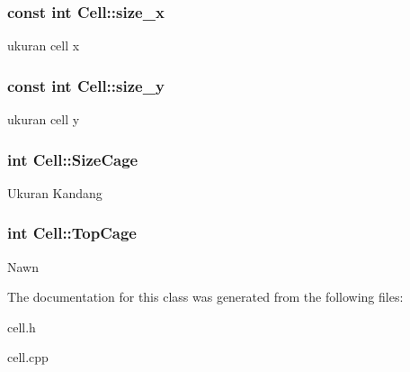 \subsubsection[{\texorpdfstring{size\+\_\+x}{size_x}}]{\setlength{\rightskip}{0pt plus 5cm}const int Cell\+::size\+\_\+x\hspace{0.3cm}{\ttfamily [protected]}}\hypertarget{class_cell_af80d7dad162978ba5aa1ff3fca5f632e}{}\label{class_cell_af80d7dad162978ba5aa1ff3fca5f632e}
ukuran cell x 
\subsubsection[{\texorpdfstring{size\+\_\+y}{size_y}}]{\setlength{\rightskip}{0pt plus 5cm}const int Cell\+::size\+\_\+y\hspace{0.3cm}{\ttfamily [protected]}}\hypertarget{class_cell_a9d3a8fb3bdc4e5424e096230a62651e1}{}\label{class_cell_a9d3a8fb3bdc4e5424e096230a62651e1}
ukuran cell y 
\subsubsection[{\texorpdfstring{Size\+Cage}{SizeCage}}]{\setlength{\rightskip}{0pt plus 5cm}int Cell\+::\+Size\+Cage\hspace{0.3cm}{\ttfamily [protected]}}\hypertarget{class_cell_a21f64b557520adc51e3182516a4e2b39}{}\label{class_cell_a21f64b557520adc51e3182516a4e2b39}
Ukuran Kandang 
\subsubsection[{\texorpdfstring{Top\+Cage}{TopCage}}]{\setlength{\rightskip}{0pt plus 5cm}int Cell\+::\+Top\+Cage\hspace{0.3cm}{\ttfamily [protected]}}\hypertarget{class_cell_a07fcbd02fd8a0363a9c0166a2df62e4c}{}\label{class_cell_a07fcbd02fd8a0363a9c0166a2df62e4c}
Nawn 

The documentation for this class was generated from the following files\+:\begin{DoxyCompactItemize}
\item 
cell.\+h\item 
cell.\+cpp\end{DoxyCompactItemize}
